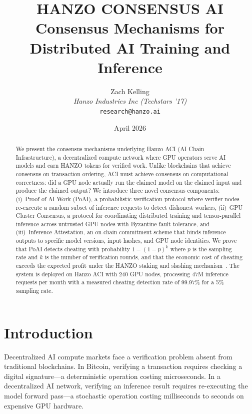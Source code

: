 \documentclass[11pt]{article}
\title{HANZO CONSENSUS AI\\[0.3em]
{\large Consensus Mechanisms for\\Distributed AI Training and Inference}}
\author{
    Zach Kelling \\
    \textit{Hanzo Industries Inc (Techstars '17)} \\
    \texttt{research@hanzo.ai}
}
\date{April 2026}
\begin{document}
\hanzocoverpage

\begin{abstract}
We present the consensus mechanisms underlying Hanzo ACI (AI Chain
Infrastructure), a decentralized compute network where GPU operators serve AI
models and earn HANZO tokens for verified work. Unlike blockchains that achieve
consensus on transaction ordering, ACI must achieve consensus on computational
correctness: did a GPU node actually run the claimed model on the claimed input
and produce the claimed output? We introduce three novel consensus components:
(i)~Proof of AI Work (PoAI), a probabilistic verification protocol where
verifier nodes re-execute a random subset of inference requests to detect
dishonest workers, (ii)~GPU Cluster Consensus, a protocol for coordinating
distributed training and tensor-parallel inference across untrusted GPU nodes
with Byzantine fault tolerance, and (iii)~Inference Attestation, an on-chain
commitment scheme that binds inference outputs to specific model versions, input
hashes, and GPU node identities. We prove that PoAI detects cheating with
probability $1 - (1-p)^k$ where $p$ is the sampling rate and $k$ is the number
of verification rounds, and that the economic cost of cheating exceeds the
expected profit under the HANZO staking and slashing
mechanism~\cite{hanzotokenomics}. The system is deployed on Hanzo ACI with 240
GPU nodes, processing 47M inference requests per month with a measured cheating
detection rate of 99.97\% for a 5\% sampling rate.
\end{abstract}

\section{Introduction}
\label{sec:intro}

Decentralized AI compute markets face a verification problem absent from
traditional blockchains. In Bitcoin, verifying a transaction requires checking a
digital signature---a deterministic operation costing microseconds. In a
decentralized AI network, verifying an inference result requires re-executing
the model forward pass---a stochastic operation costing milliseconds to seconds
on expensive GPU hardware.
\end{document}
